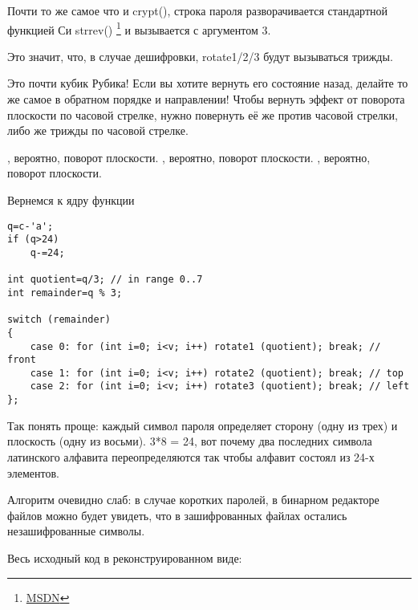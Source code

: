 Почти то же самое что и crypt(),  строка пароля разворачивается стандартной функцией Си
strrev() \footnote{\href{http://go.yurichev.com/17249}{MSDN}}
и  вызывается с аргументом 3.

Это значит, что, в случае дешифровки, rotate1/2/3 будут вызываться трижды.

Это почти кубик Рубика!
Если вы хотите вернуть его состояние назад, делайте то же самое в обратном порядке и направлении!
Чтобы вернуть эффект от поворота плоскости по часовой стрелке, нужно повернуть её же против 
часовой стрелки, либо же трижды по часовой стрелке.

, вероятно, поворот  плоскости. 
, вероятно, поворот  плоскости.
, вероятно, поворот  плоскости.

Вернемся к ядру функции 

\begin{lstlisting}[style=customc]
q=c-'a';
if (q>24)
	q-=24;

int quotient=q/3; // in range 0..7
int remainder=q % 3;

switch (remainder)
{
    case 0: for (int i=0; i<v; i++) rotate1 (quotient); break; // front
    case 1: for (int i=0; i<v; i++) rotate2 (quotient); break; // top
    case 2: for (int i=0; i<v; i++) rotate3 (quotient); break; // left
};
\end{lstlisting}

Так понять проще: каждый символ пароля определяет сторону (одну из трех) и плоскость (одну из восьми).
3*8 = 24, вот почему два последних символа латинского алфавита переопределяются так чтобы алфавит состоял
из 24-х элементов.

Алгоритм очевидно слаб: в случае коротких паролей, в бинарном редакторе файлов можно будет увидеть, 
что в зашифрованных файлах остались незашифрованные символы.

Весь исходный код в реконструированном виде:



